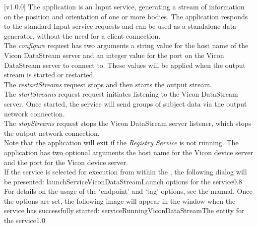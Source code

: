 [v1.0.0]
The  application is an Input service,
generating a stream of information on the position and orientation of one or more bodies.
The application responds to the standard Input service requests and can be used as a
standalone data generator, without the need for a client connection.\\

The \emph{configure} request has two arguments \longDash{} a string value for the host
name of the Vicon DataStream server and an integer value for the port on the Vicon
DataStream server to connect to.
These values will be applied when the output stream is started or restarted.\\ 

The \emph{restartStreams} request stops and then starts the output stream.\\

The \emph{startStreams} request request initiates listening to the Vicon DataStream
server.
Once started, the service will send groups of subject data via the output \yarp{} network
connection.\\

The \emph{stopStreams} request stops the Vicon DataStream server listener, which stops the
output \yarp{} network connection.\\ 

Note that the application will exit if the \emph{Registry Service} is not running.
The application has two optional arguments \longDash{} the host name for the Vicon device
server and the port for the Vicon device server.
\insertAppParameters
\insertTagDescription{\VDSI}
\insertInputServiceComment\\

\insertStandardServiceCommands
\secondaryEnd
{}
If the service is selected for execution from within the \emph{\MMMU}, the following
dialog will be presented:
%
{launchServiceViconDataStream}{Launch options for the \VDSI{} service}{0.8}
\condPage{}
For details on the usage of the `endpoint' and `tag' options, see the \emph{\MMMU} manual.
Once the options are set, the following image will appear in the \emph{\MMMU} window when
the service has successfully started:
%
{serviceRunningViconDataStream}{The \emph{\MMMU} entity for the \VDSI{} service}{1.0}

